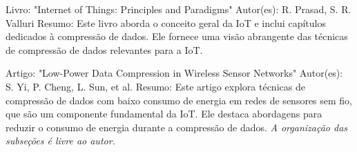 Livro: "Internet of Things: Principles and Paradigms"
    Autor(es): R. Prasad, S. R. Valluri
    Resumo: Este livro aborda o conceito geral da IoT e inclui capítulos dedicados à compressão de dados. Ele fornece uma visão abrangente das técnicas de compressão de dados relevantes para a IoT.

Artigo: "Low-Power Data Compression in Wireless Sensor Networks"
    Autor(es): S. Yi, P. Cheng, L. Sun, et al.
    Resumo: Este artigo explora técnicas de compressão de dados com baixo consumo de energia em redes de sensores sem fio, que são um componente fundamental da IoT. Ele destaca abordagens para reduzir o consumo de energia durante a compressão de dados.
\textit{A organização das subseções é livre ao autor.}

